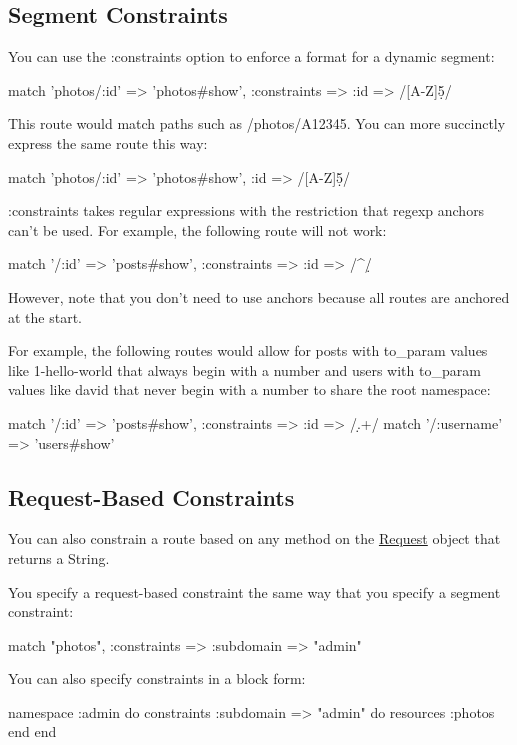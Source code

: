 \documentclass[10pt]{book}
\newenvironment{code}{%
  \scriptsize
    \verbatim
}{%
    \endverbatim
    \newline
}
\begin{document}
\subsection{ Segment Constraints}

You can use the :constraints option to enforce a format for a dynamic segment:
\begin{code}
match 'photos/:id' => 'photos#show', 
:constraints => { :id => /[A-Z]\d{5}/ }
\end{code}

This route would match paths such as /photos/A12345. You can more succinctly express the same route this way:
\begin{code}
match 'photos/:id' => 'photos#show', :id => /[A-Z]\d{5}/
\end{code}

:constraints takes regular expressions with the restriction  that regexp anchors can’t be used. For example, the following route will  not work:
\begin{code}
match '/:id' => 'posts#show', :constraints => {:id => /^\d/}
\end{code}

However, note that you don’t need to use anchors because all routes are anchored at the start.

For example, the following routes would allow for posts with to\_param values like 1-hello-world that always begin with a number and users with to\_param values like david that never begin with a number to share the root namespace:
\begin{code}
match '/:id' => 'posts#show', :constraints => { :id => /\d.+/ }
match '/:username' => 'users#show'
\end{code}

\subsection{ Request-Based Constraints}

You can also constrain a route based on any method on the \href{http://guides.rubyonrails.org/action_controller_overview.html#the-request-object}{Request} object that returns a String.

You specify a request-based constraint the same way that you specify a segment constraint:
\begin{code}
match "photos", :constraints => {:subdomain => "admin"}
\end{code}

You can also specify constraints in a block form:
\begin{code}
namespace :admin do
  constraints :subdomain => "admin" do
    resources :photos
  end
end
\end{code}
\end{document}
